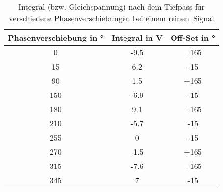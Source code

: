 \begin{table}[h!]
\begin{center}
\begin{tabular}{c | c | c}
	Phasenverschiebung in \si{\degree} & Integral in \si{\volt} & Off-Set in \si{\degree} \\
	\hline
	0   & -9.5 & +165 \\
	15  & 6.2 & -15 \\
	90  & 1.5 & +165 \\
	150 & -6.9 & -15 \\
	180 & 9.1 & +165 \\
	210 & -5.7 & -15 \\
	255 & 0 & -15 \\
	270 & -1.5 & +165 \\
	315 & -7.6 & +165 \\
	345 & 7 & -15
\end{tabular}
\caption{Integral (bzw. Gleichspannung) nach dem Tiefpass für verschiedene Phasenverschiebungen bei einem \glqq reinen\grqq\ Signal}
\label{Integral_ohne}
\end{center}
\end{table}